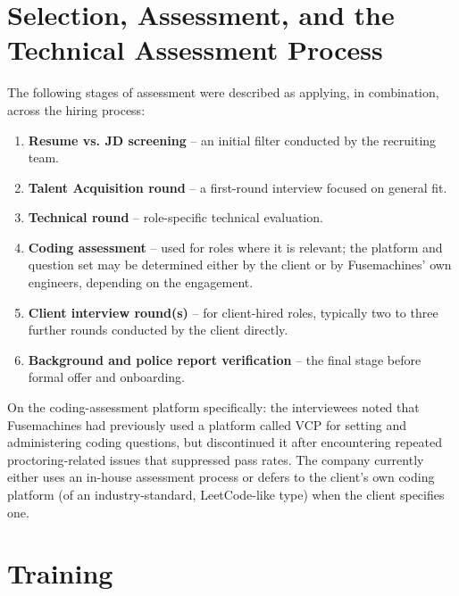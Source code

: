 \documentclass[12pt,a4paper]{report}
\begin{document}
\section{Selection, Assessment, and the Technical Assessment Process}

The following stages of assessment were described as applying, in combination, across the hiring process:

\begin{enumerate}[leftmargin=1.5cm]
  \item \textbf{Resume vs. JD screening} -- an initial filter conducted by the recruiting team.
  \item \textbf{Talent Acquisition round} -- a first-round interview focused on general fit.
  \item \textbf{Technical round} -- role-specific technical evaluation.
  \item \textbf{Coding assessment} -- used for roles where it is relevant; the platform and question set may be determined either by the client or by Fusemachines' own engineers, depending on the engagement.
  \item \textbf{Client interview round(s)} -- for client-hired roles, typically two to three further rounds conducted by the client directly.
  \item \textbf{Background and police report verification} -- the final stage before formal offer and onboarding.
\end{enumerate}

On the coding-assessment platform specifically: the interviewees noted that Fusemachines had previously used a platform called VCP for setting and administering coding questions, but discontinued it after encountering repeated proctoring-related issues that suppressed pass rates. The company currently either uses an in-house assessment process or defers to the client's own coding platform (of an industry-standard, LeetCode-like type) when the client specifies one.

\section{Training}
\end{document}
